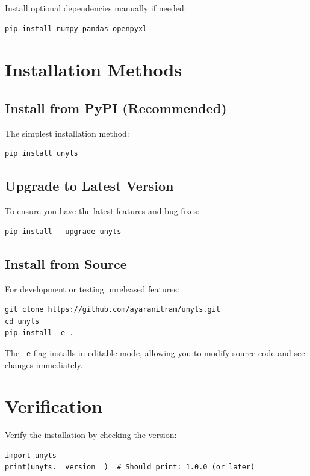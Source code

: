 \documentclass[11pt,a4paper]{report}
\begin{document}
Install optional dependencies manually if needed:
\begin{lstlisting}[style=bashstyle]
pip install numpy pandas openpyxl
\end{lstlisting}

\section{Installation Methods}

\subsection{Install from PyPI (Recommended)}

The simplest installation method:
\begin{lstlisting}[style=bashstyle]
pip install unyts
\end{lstlisting}

\subsection{Upgrade to Latest Version}

To ensure you have the latest features and bug fixes:
\begin{lstlisting}[style=bashstyle]
pip install --upgrade unyts
\end{lstlisting}

\subsection{Install from Source}

For development or testing unreleased features:
\begin{lstlisting}[style=bashstyle]
git clone https://github.com/ayaranitram/unyts.git
cd unyts
pip install -e .
\end{lstlisting}

The \texttt{-e} flag installs in editable mode, allowing you to modify source code and see changes immediately.

\section{Verification}

Verify the installation by checking the version:

\begin{lstlisting}[style=pythonstyle]
import unyts
print(unyts.__version__)  # Should print: 1.0.0 (or later)
\end{lstlisting}
\end{document}
